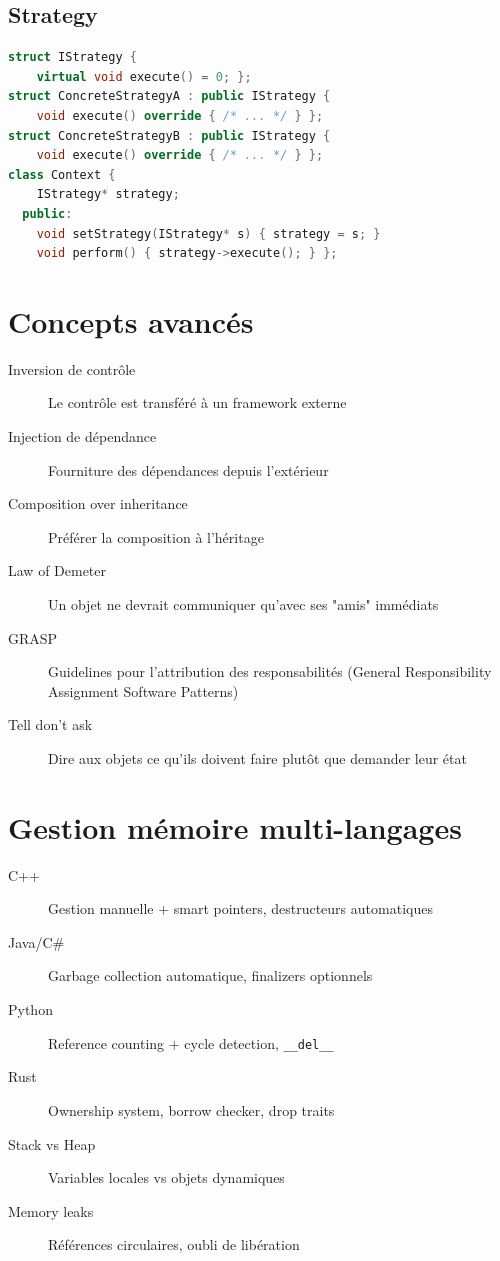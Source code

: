\documentclass{article}
\begin{document}
\begin{multicols*}{3}
\subsection*{Strategy}
\begin{lstlisting}[language=C++]
struct IStrategy {
    virtual void execute() = 0; };
struct ConcreteStrategyA : public IStrategy {
    void execute() override { /* ... */ } };
struct ConcreteStrategyB : public IStrategy {
    void execute() override { /* ... */ } };
class Context {
    IStrategy* strategy;
  public:
    void setStrategy(IStrategy* s) { strategy = s; }
    void perform() { strategy->execute(); } };
\end{lstlisting}

\section*{Concepts avancés}
\begin{description}
\item[Inversion de contrôle] Le contrôle est transféré à un framework externe
\item[Injection de dépendance] Fourniture des dépendances depuis l'extérieur
\item[Composition over inheritance] Préférer la composition à l'héritage
\item[Law of Demeter] Un objet ne devrait communiquer qu'avec ses "amis" immédiats
\item[GRASP] Guidelines pour l'attribution des responsabilités (General Responsibility Assignment Software Patterns)
\item[Tell don't ask] Dire aux objets ce qu'ils doivent faire plutôt que demander leur état
\end{description}

\section*{Gestion mémoire multi-langages}
\begin{description}
\item[C++] Gestion manuelle + smart pointers, destructeurs automatiques
\item[Java/C\#] Garbage collection automatique, finalizers optionnels
\item[Python] Reference counting + cycle detection, \texttt{\_\_del\_\_}
\item[Rust] Ownership system, borrow checker, drop traits
\item[Stack vs Heap] Variables locales vs objets dynamiques
\item[Memory leaks] Références circulaires, oubli de libération
\end{description}


\end{multicols*}
\end{document}
